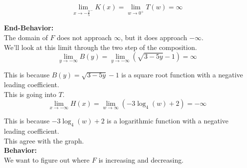 \documentclass{ximera}
\begin{document}
\[
\lim\limits_{x \to -\frac{2}{5}^-} K(x)  = \lim\limits_{w \to 0^+} T(w) = \infty
\]
















\textbf{\textcolor{blue!55!black}{End-Behavior:}} \\

The domain of $F$ does not approach $\infty$, but it does approach $-\infty$. \\


We'll look at this limit through the two step of the composition. \\





\[
\lim\limits_{y \to -\infty} B(y)  = \lim\limits_{y \to -\infty} (\sqrt{3 - 5y} - 1)  = \infty
\]


This is because $B(y) = \sqrt{3 - 5y} - 1$ is a square root function with a negative leading coefficient. \\


This is going into $T$. \\



\[
\lim\limits_{x \to -\infty} H(x)  = \lim\limits_{w \to \infty} (-3 \log_4(w) + 2)  = -\infty
\]


This is because $-3 \log_4(w) + 2$ is a logarithmic function with a negative leading coefficient. \\




This agree with the graph.  \\
























\textbf{\textcolor{blue!55!black}{Behavior:}} \\


We want to figure out where $F$ is increasing and decreasing. \\
\end{document}
